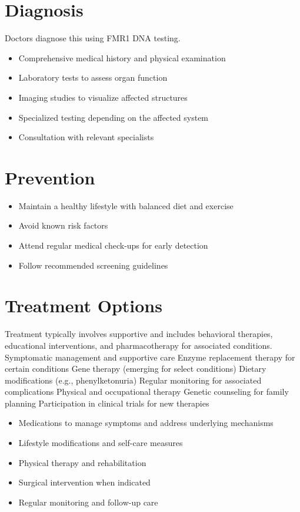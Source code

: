 \section{Diagnosis}
Doctors diagnose this using FMR1 DNA testing.

\begin{itemize}[noitemsep]
  \item Comprehensive medical history and physical examination
  \item Laboratory tests to assess organ function
  \item Imaging studies to visualize affected structures
  \item Specialized testing depending on the affected system
  \item Consultation with relevant specialists
\end{itemize}
\section{Prevention}
\begin{itemize}[noitemsep]
  \item Maintain a healthy lifestyle with balanced diet and exercise
  \item Avoid known risk factors
  \item Attend regular medical check-ups for early detection
  \item Follow recommended screening guidelines
\end{itemize}
\section{Treatment Options}
Treatment typically involves supportive and includes behavioral therapies, educational interventions, and pharmacotherapy for associated conditions. Symptomatic management and supportive care Enzyme replacement therapy for certain conditions Gene therapy (emerging for select conditions) Dietary modifications (e.g., phenylketonuria) Regular monitoring for associated complications Physical and occupational therapy Genetic counseling for family planning Participation in clinical trials for new therapies

\begin{itemize}[noitemsep]
  \item Medications to manage symptoms and address underlying mechanisms
  \item Lifestyle modifications and self-care measures
  \item Physical therapy and rehabilitation
  \item Surgical intervention when indicated
  \item Regular monitoring and follow-up care
\end{itemize}
